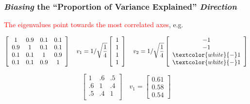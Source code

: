 \documentclass[xcolor={dvipsnames}]{beamer}
\begin{document}
{${}$\\${}$\\${}$\\${}$\\${}$\\${}$\\${}$\\

}



\frame
{
 \frametitle{\emph{Biasing} the ``Proportion of Variance Explained'' \emph{Direction}}

\textcolor{red}{The eigenvalues point towards the most correlated axes}, e.g.

\tiny 
$$
\left[
\begin{array}{cccc}
1 & 0.9 & 0.1 &  0.1\\
0.9 & 1 & 0.1 &  0.1\\
 0.1 &  0.1 & 1 & 0.9 \\
 0.1 &  0.1 & 0.9 & 1 \\
\end{array}
\right]
\quad v_1 = 
1/\sqrt{\frac{1}{4}}\left[
\begin{array}{c}
1 \\
1 \\
1  \\
1  \\
\end{array}
\right]
\quad  v_2 = 
1/\sqrt{\frac{1}{4}}\left[
\begin{array}{c}
-1 \\
-1 \\
\textcolor{white}{-}1  \\
\textcolor{white}{-}1  \\
\end{array}
\right]
$$

$$
\left[
\begin{array}{ccc}
1 & .6 & .5 \\
.6 & 1 & .4 \\
.5 &  .4 & 1  \\
\end{array}
\right]
\quad  v_1 = 
\left[
\begin{array}{c}
0.61\\
0.58\\
0.54
\end{array}
\right]
$$

$\;$

$\;$

\normalsize

}
\end{document}
